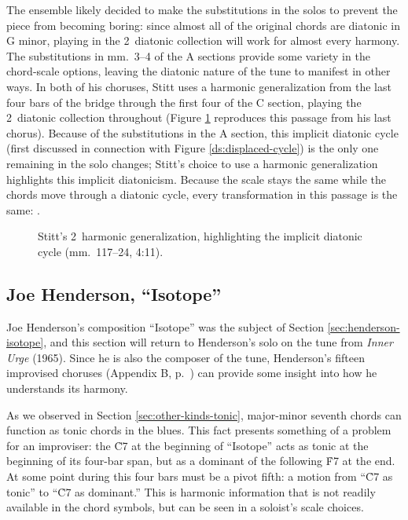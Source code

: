 The ensemble likely decided to make the substitutions in the solos to prevent
the piece from becoming boring: since almost all of the original chords are
diatonic in G minor, playing in the 2\flat\ diatonic collection will work for
almost every harmony. The substitutions in mm.~3--4 of the A
sections provide some variety in the chord-scale options, leaving the diatonic
nature of the tune to manifest in other ways. In both of his choruses, Stitt
uses a harmonic generalization from the last four bars of the bridge through the
first four of the C section, playing the 2\flat\ diatonic collection
throughout (Figure \ref{csa:stitt-diatonic-generalization} reproduces this
passage from his last chorus). Because of the substitutions in the A section,
this implicit diatonic cycle (first discussed in connection with Figure
\ref{ds:displaced-cycle}) is the only one remaining in the solo changes;
Stitt's choice to use a harmonic generalization highlights this implicit
diatonicism. Because the scale stays the same while the chords move
through a diatonic cycle, every transformation in this passage is the same:
.

\begin{figure}[tbp]
  \caption[Stitt's 2\flat\ harmonic generalization, highlighting the implicit
    diatonic cycle.]{Stitt's 2\kern1pt\flat\ harmonic generalization,
    highlighting the implicit diatonic cycle (mm.~117--24, 4:11).}
  \label{csa:stitt-diatonic-generalization}
\end{figure}

\subsection{Joe Henderson, “Isotope”}
\label{subsec:isotope-solo}

Joe Henderson's composition ``Isotope'' was the subject of Section
\ref{sec:henderson-isotope}, and this section will return to Henderson's solo on
the tune from \emph{Inner Urge} (1965). Since he is also the composer of the
tune, Henderson's fifteen improvised choruses (Appendix B,
p.~\pageref{transcription:isotope}) can provide some insight into how he
understands its harmony.


As we observed in Section \ref{sec:other-kinds-tonic}, major-minor seventh
chords can function as tonic chords in the blues. This fact presents something
of a problem for an improviser: the \h{C7} at the beginning of ``Isotope''
acts as tonic at the beginning of its four-bar span, but as a dominant of the
following \h{F7} at the end. At some point during this four bars
must be a pivot fifth: a motion from ``\h{C7} as tonic'' to ``\h{C7} as
dominant.'' This is harmonic information that is not readily available in the
chord symbols, but can be seen in a soloist's scale choices.

